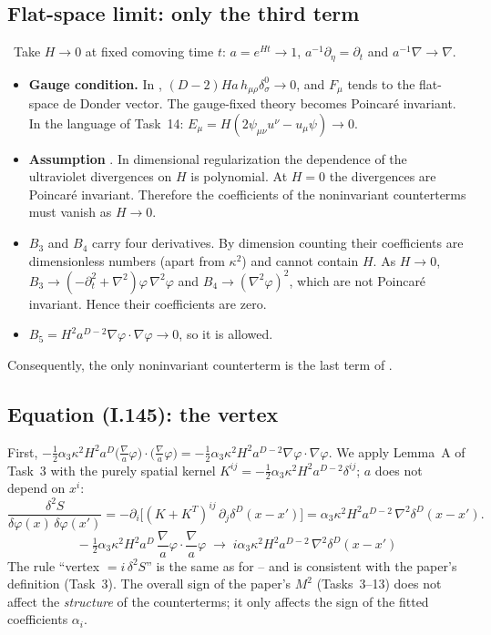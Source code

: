 \subsection{Flat-space limit: only the third term}
\tD{}\,\tA{}
Take $H\to0$ at fixed comoving time $t$: $a=e^{Ht}\to1$, $a^{-1}\partial_\eta=\partial_t$ and $a^{-1}\nabla\to\nabla$.
\begin{itemize}[leftmargin=14pt]
\item \textbf{Gauge condition.} In , $(D-2)Ha\,h_{\mu\rho}\delta^0_\sigma\to0$, and $F_\mu$ tends to the flat-space de Donder vector.
The gauge-fixed theory becomes Poincar\'e invariant.
In the language of Task~14: $E_\mu=H(2\psi_{\mu\nu}u^\nu-u_\mu\psi)\to0$.
\item \textbf{Assumption} \tA. In dimensional regularization the dependence of the ultraviolet divergences on $H$ is polynomial.
At $H=0$ the divergences are Poincar\'e invariant. Therefore the coefficients of the noninvariant counterterms must vanish as $H\to0$.
\item $B_3$ and $B_4$ carry four derivatives. By dimension counting their coefficients are dimensionless numbers (apart from $\kappa^2$) and cannot contain $H$.
As $H\to0$, $B_3\to(-\partial_t^2+\nabla^2)\varphi\,\nabla^2\varphi$ and $B_4\to(\nabla^2\varphi)^2$, which are not Poincar\'e invariant. Hence their coefficients are zero.
\item $B_5=H^2a^{D-2}\nabla\varphi\cdot\nabla\varphi\to0$, so it is allowed.
\end{itemize}
Consequently, the only noninvariant counterterm is the last term of . \checkmark

\subsection{Equation (I.145): the vertex}
\tD{}
First, $-\tfrac12\alpha_3\kappa^2H^2a^D\big(\tfrac{\nabla}{a}\varphi\big)\cdot\big(\tfrac{\nabla}{a}\varphi\big)=-\tfrac12\alpha_3\kappa^2H^2a^{D-2}\nabla\varphi\cdot\nabla\varphi$.
We apply Lemma~A of Task~3 with the purely spatial kernel $K^{ij}=-\tfrac12\alpha_3\kappa^2H^2a^{D-2}\delta^{ij}$; $a$ does not depend on $x^i$:
\begin{equation*}
\frac{\delta^2S}{\delta\varphi(x)\,\delta\varphi(x')}=-\partial_i\Big[(K+K^T)^{ij}\,\partial_j\delta^D(x-x')\Big]=\alpha_3\kappa^2H^2a^{D-2}\,\nabla^2\delta^D(x-x') .
\end{equation*}
\begin{equation*}
\boxed{\;-\tfrac12\alpha_3\kappa^2H^2a^D\,\frac{\nabla}{a}\varphi\cdot\frac{\nabla}{a}\varphi\;\longrightarrow\;i\alpha_3\kappa^2H^2a^{D-2}\,\nabla^2\delta^D(x-x')\;}
\tag{I.145}
\end{equation*}
The rule ``vertex $=i\,\delta^2S$'' is the same as for -- and is consistent with the paper's definition  (Task~3). \checkmark{}
The overall sign of the paper's $M^2$ (Tasks~3--13) does not affect the \emph{structure} of the counterterms; it only affects the sign of the fitted coefficients $\alpha_i$.

